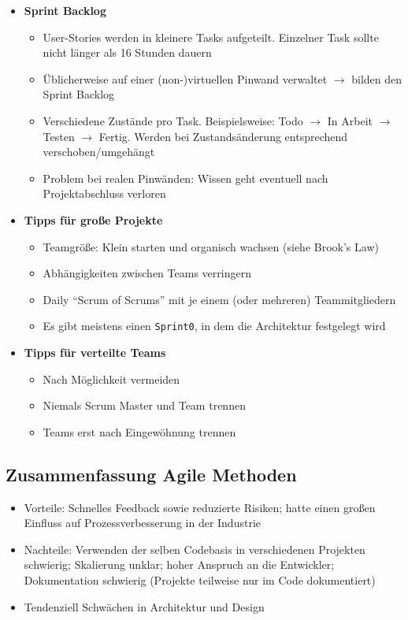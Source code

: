 \begin{itemize}
\begin{itemize}
	\end{itemize}
	\item \textbf{Sprint Backlog}
	\begin{itemize}
		\item User-Stories werden in kleinere Tasks aufgeteilt. Einzelner Task sollte nicht länger als 16 Stunden dauern
		\item Üblicherweise auf einer (non-)virtuellen Pinwand verwaltet \(\rightarrow\) bilden den Sprint Backlog
		\item Verschiedene Zustände pro Task. Beispielsweise: Todo \(\rightarrow\) In Arbeit \(\rightarrow\) Testen \(\rightarrow\) Fertig. Werden bei Zustandsänderung entsprechend verschoben/umgehängt
		\item Problem bei realen Pinwänden: Wissen geht eventuell nach Projektabschluss verloren
	\end{itemize}
	\item \textbf{Tipps für große Projekte}
	\begin{itemize}
		\item Teamgröße: Klein starten und organisch wachsen (siehe Brook's Law)
		\item Abhängigkeiten zwischen Teams verringern
		\item Daily "`Scrum of Scrums"' mit je einem (oder mehreren) Teammitgliedern
		\item Es gibt meistens einen \texttt{Sprint0}, in dem die Architektur festgelegt wird
	\end{itemize}
	\item \textbf{Tipps für verteilte Teams}
	\begin{itemize}
		\item Nach Möglichkeit vermeiden
		\item Niemals Scrum Master und Team trennen
		\item Teams erst nach Eingewöhnung trennen
	\end{itemize}
\end{itemize}


\subsection{Zusammenfassung Agile Methoden}
\begin{itemize}
	\item Vorteile: Schnelles Feedback sowie reduzierte Risiken; hatte einen großen Einfluss auf Prozessverbesserung in der Industrie
	\item Nachteile: Verwenden der selben Codebasis in verschiedenen Projekten schwierig; Skalierung unklar; hoher Anspruch an die Entwickler; Dokumentation schwierig (Projekte teilweise nur im Code dokumentiert)
	\item Tendenziell Schwächen in Architektur und Design
\end{itemize}



